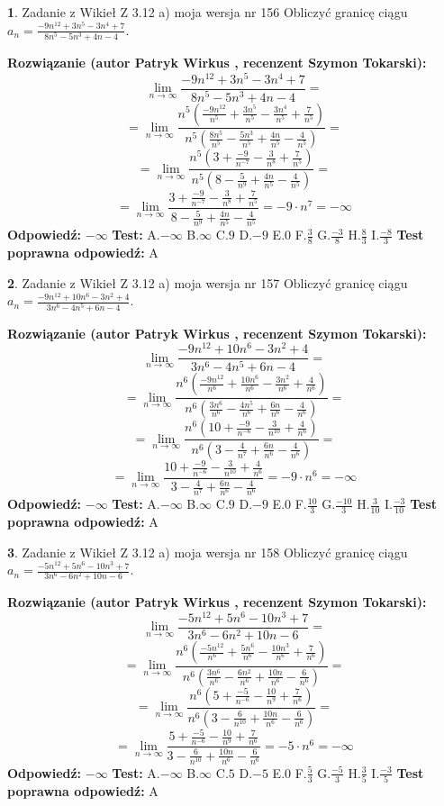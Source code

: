 \documentclass[12pt, a4paper]{article}
\theoremstyle{definition} %
\newtheorem{zad}{}
\newcommand{\zadStart}[1]{\begin{zad}#1\newline}
\newcommand{\zadStop}{\end{zad}}
\newcommand{\rozwStart}[2]{\noindent \textbf{Rozwiązanie (autor #1 , recenzent #2): }\newline}
\newcommand{\rozwStop}{\newline}
\newcommand{\odpStart}{\noindent \textbf{Odpowiedź:}\newline}
\newcommand{\odpStop}{\newline}
\newcommand{\testStart}{\noindent \textbf{Test:}\newline}
\newcommand{\testStop}{\newline}
\newcommand{\kluczStart}{\noindent \textbf{Test poprawna odpowiedź:}\newline}
\newcommand{\kluczStop}{\newline}
\begin{document}
\zadStart{Zadanie z Wikieł Z 3.12 a) moja wersja nr 156}
Obliczyć granicę ciągu $a_{n}=\frac{-9n^{12}+3n^{5}-3n^{4}+7}{8n^{5}-5n^{3}+4n-4}$.
\zadStop
\rozwStart{Patryk Wirkus}{Szymon Tokarski}
$$\lim\limits_{n\to\infty}\frac{-9n^{12}+3n^{5}-3n^{4}+7}{8n^{5}-5n^{3}+4n-4}=$$
$$=\lim\limits_{n\to\infty}\frac{n^{5}\left(\frac{-9n^{12}}{n^{5}}+\frac{3n^{5}}{n^{5}}-\frac{3n^{4}}{n^{5}}+\frac{7}{n^{5}}\right)}{n^{5}\left(\frac{8n^{5}}{n^{5}}-\frac{5n^{3}}{n^{5}}+\frac{4n}{n^{5}}-\frac{4}{n^{5}}\right)}=$$
$$=\lim\limits_{n\to\infty}\frac{n^{5}\left(3+\frac{-9}{n^{-7}}-\frac{3}{n^{8}}+\frac{7}{n^{5}}\right)}
{n^{5}\left(8-\frac{5}{n^{9}}+\frac{4n}{n^{5}}-\frac{4}{n^{5}}\right)}=$$
$$=\lim\limits_{n\to\infty}\frac{3+\frac{-9}{n^{-7}}-\frac{3}{n^{8}}+\frac{7}{n^{5}}}{8-\frac{5}{n^{9}}+\frac{4n}{n^{5}}-\frac{4}{n^{5}}}=-9\cdot n^{7} = -\infty$$
\rozwStop
\odpStart
$-\infty$
\odpStop
\testStart
A.$-\infty$
B.$\infty$
C.$9$
D.$-9$
E.$0$
F.$\frac{3}{8}$
G.$\frac{-3}{8}$
H.$\frac{8}{3}$
I.$\frac{-8}{3}$
\testStop
\kluczStart
A
\kluczStop



\zadStart{Zadanie z Wikieł Z 3.12 a) moja wersja nr 157}
Obliczyć granicę ciągu $a_{n}=\frac{-9n^{12}+10n^{6}-3n^{2}+4}{3n^{6}-4n^{5}+6n-4}$.
\zadStop
\rozwStart{Patryk Wirkus}{Szymon Tokarski}
$$\lim\limits_{n\to\infty}\frac{-9n^{12}+10n^{6}-3n^{2}+4}{3n^{6}-4n^{5}+6n-4}=$$
$$=\lim\limits_{n\to\infty}\frac{n^{6}\left(\frac{-9n^{12}}{n^{6}}+\frac{10n^{6}}{n^{6}}-\frac{3n^{2}}{n^{6}}+\frac{4}{n^{6}}\right)}{n^{6}\left(\frac{3n^{6}}{n^{6}}-\frac{4n^{5}}{n^{6}}+\frac{6n}{n^{6}}-\frac{4}{n^{6}}\right)}=$$
$$=\lim\limits_{n\to\infty}\frac{n^{6}\left(10+\frac{-9}{n^{-6}}-\frac{3}{n^{10}}+\frac{4}{n^{6}}\right)}
{n^{6}\left(3-\frac{4}{n^{7}}+\frac{6n}{n^{6}}-\frac{4}{n^{6}}\right)}=$$
$$=\lim\limits_{n\to\infty}\frac{10+\frac{-9}{n^{-6}}-\frac{3}{n^{10}}+\frac{4}{n^{6}}}{3-\frac{4}{n^{7}}+\frac{6n}{n^{6}}-\frac{4}{n^{6}}}=-9\cdot n^{6} = -\infty$$
\rozwStop
\odpStart
$-\infty$
\odpStop
\testStart
A.$-\infty$
B.$\infty$
C.$9$
D.$-9$
E.$0$
F.$\frac{10}{3}$
G.$\frac{-10}{3}$
H.$\frac{3}{10}$
I.$\frac{-3}{10}$
\testStop
\kluczStart
A
\kluczStop



\zadStart{Zadanie z Wikieł Z 3.12 a) moja wersja nr 158}
Obliczyć granicę ciągu $a_{n}=\frac{-5n^{12}+5n^{6}-10n^{3}+7}{3n^{6}-6n^{2}+10n-6}$.
\zadStop
\rozwStart{Patryk Wirkus}{Szymon Tokarski}
$$\lim\limits_{n\to\infty}\frac{-5n^{12}+5n^{6}-10n^{3}+7}{3n^{6}-6n^{2}+10n-6}=$$
$$=\lim\limits_{n\to\infty}\frac{n^{6}\left(\frac{-5n^{12}}{n^{6}}+\frac{5n^{6}}{n^{6}}-\frac{10n^{3}}{n^{6}}+\frac{7}{n^{6}}\right)}{n^{6}\left(\frac{3n^{6}}{n^{6}}-\frac{6n^{2}}{n^{6}}+\frac{10n}{n^{6}}-\frac{6}{n^{6}}\right)}=$$
$$=\lim\limits_{n\to\infty}\frac{n^{6}\left(5+\frac{-5}{n^{-6}}-\frac{10}{n^{9}}+\frac{7}{n^{6}}\right)}
{n^{6}\left(3-\frac{6}{n^{10}}+\frac{10n}{n^{6}}-\frac{6}{n^{6}}\right)}=$$
$$=\lim\limits_{n\to\infty}\frac{5+\frac{-5}{n^{-6}}-\frac{10}{n^{9}}+\frac{7}{n^{6}}}{3-\frac{6}{n^{10}}+\frac{10n}{n^{6}}-\frac{6}{n^{6}}}=-5\cdot n^{6} = -\infty$$
\rozwStop
\odpStart
$-\infty$
\odpStop
\testStart
A.$-\infty$
B.$\infty$
C.$5$
D.$-5$
E.$0$
F.$\frac{5}{3}$
G.$\frac{-5}{3}$
H.$\frac{3}{5}$
I.$\frac{-3}{5}$
\testStop
\kluczStart
A
\kluczStop
\end{document}
